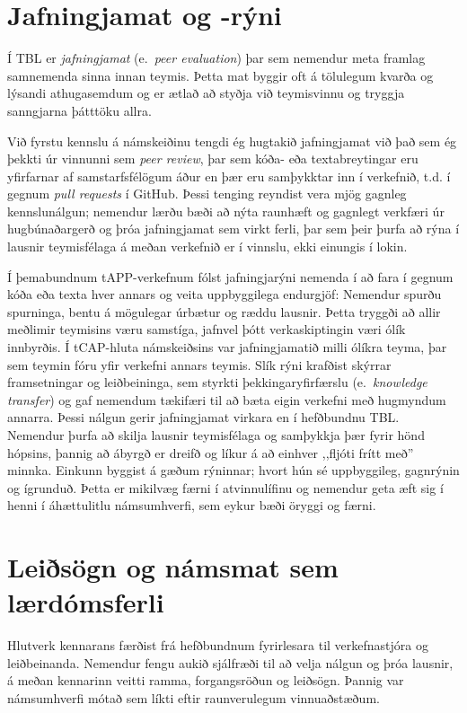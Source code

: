 \documentclass{article}
\begin{document}
\section*{Jafningjamat og -rýni}
Í TBL er \emph{jafningjamat} (e.~\emph{peer evaluation}) þar sem nemendur meta framlag samnemenda sinna innan teymis. Þetta mat byggir oft á tölulegum kvarða og lýsandi athugasemdum og er ætlað að styðja við teymisvinnu og tryggja sanngjarna þátttöku allra.

Við fyrstu kennslu á námskeiðinu tengdi ég hugtakið jafningjamat við það sem ég þekkti úr vinnunni sem \emph{peer review}, þar sem kóða- eða textabreytingar eru yfirfarnar af samstarfsfélögum áður en þær eru samþykktar inn í verkefnið, t.d. í gegnum \emph{pull requests} í GitHub. Þessi tenging reyndist vera mjög gagnleg kennslunálgun; nemendur lærðu bæði að nýta raunhæft og gagnlegt verkfæri úr hugbúnaðargerð og þróa jafningjamat sem virkt ferli, þar sem þeir þurfa að rýna í lausnir teymisfélaga á meðan verkefnið er í vinnslu, ekki einungis í lokin.

Í þemabundnum tAPP-verkefnum fólst jafningjarýni nemenda í að fara í gegnum kóða eða texta hver annars og veita uppbyggilega endurgjöf: Nemendur spurðu spurninga, bentu á mögulegar úrbætur og ræddu lausnir. Þetta tryggði að allir meðlimir teymisins væru samstíga, jafnvel þótt verkaskiptingin væri ólík innbyrðis. Í tCAP-hluta námskeiðsins var jafningjamatið milli ólíkra teyma, þar sem teymin fóru yfir verkefni annars teymis. Slík rýni krafðist skýrrar framsetningar og leiðbeininga, sem styrkti þekkingaryfirfærslu (e.~\emph{knowledge transfer}) og gaf nemendum tækifæri til að bæta eigin verkefni með hugmyndum annarra. Þessi nálgun gerir jafningjamat virkara en í hefðbundnu TBL. Nemendur þurfa að skilja lausnir teymisfélaga og samþykkja þær fyrir hönd hópsins, þannig að ábyrgð er dreifð og líkur á að einhver ,,fljóti frítt með'' minnka. Einkunn byggist á gæðum rýninnar; hvort hún sé uppbyggileg, gagnrýnin og ígrunduð. Þetta er mikilvæg færni í atvinnulífinu og nemendur geta æft sig í henni í áhættulitlu námsumhverfi, sem eykur bæði öryggi og færni.

\section*{Leiðsögn og námsmat sem lærdómsferli}
Hlutverk kennarans færðist frá hefðbundnum fyrirlesara til verkefnastjóra og leiðbeinanda. Nemendur fengu aukið sjálfræði til að velja nálgun og þróa lausnir, á meðan kennarinn veitti ramma, forgangsröðun og leiðsögn. Þannig var námsumhverfi mótað sem líkti eftir raunverulegum vinnuaðstæðum.
\end{document}
